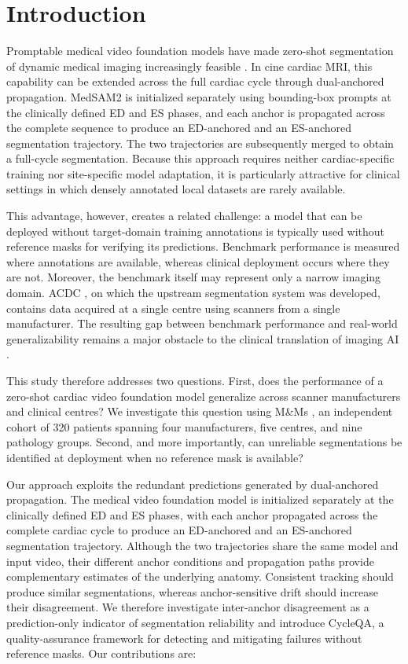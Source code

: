 \documentclass[runningheads]{llncs}
\newcommand{\CQ}{CycleQA}
\begin{document}
\section{Introduction}
Promptable medical video foundation models have made zero-shot segmentation of dynamic medical imaging increasingly feasible \cite{ravi2024sam2,zhu2024medsam2}. In cine cardiac MRI, this capability can be extended across the full cardiac cycle through dual-anchored propagation. MedSAM2 is initialized separately using bounding-box prompts at the clinically defined ED and ES phases, and each anchor is propagated across the complete sequence to produce an ED-anchored and an ES-anchored segmentation trajectory. The two trajectories are subsequently merged to obtain a full-cycle segmentation. Because this approach requires neither cardiac-specific training nor site-specific model adaptation, it is particularly attractive for clinical settings in which densely annotated local datasets are rarely available.

This advantage, however, creates a related challenge: a model that can be deployed without target-domain training annotations is typically used without reference masks for verifying its predictions. Benchmark performance is measured where annotations are available, whereas clinical deployment occurs where they are not. Moreover, the benchmark itself may represent only a narrow imaging domain. ACDC \cite{bernard2018acdc}, on which the upstream segmentation system was developed, contains data acquired at a single centre using scanners from a single manufacturer. The resulting gap between benchmark performance and real-world generalizability remains a major obstacle to the clinical translation of imaging AI \cite{varoquaux2022failures,moor2023gmai}.

This study therefore addresses two questions. First, does the performance of a zero-shot cardiac video foundation model generalize across scanner manufacturers and clinical centres? We investigate this question using M\&Ms \cite{campello2021mnms}, an independent cohort of 320 patients spanning four manufacturers, five centres, and nine pathology groups. Second, and more importantly, can unreliable segmentations be identified at deployment when no reference mask is available?

Our approach exploits the redundant predictions generated by dual-anchored propagation. The medical video foundation model is initialized separately at the clinically defined ED and ES phases, with each anchor propagated across the complete cardiac cycle to produce an ED-anchored and an ES-anchored segmentation trajectory. Although the two trajectories share the same model and input video, their different anchor conditions and propagation paths provide complementary estimates of the underlying anatomy. Consistent tracking should produce similar segmentations, whereas anchor-sensitive drift should increase their disagreement. We therefore investigate inter-anchor disagreement as a prediction-only indicator of segmentation reliability and introduce \CQ{}, a quality-assurance framework for detecting and mitigating failures without reference masks. Our contributions are:
\end{document}
